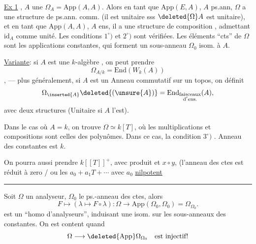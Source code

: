 \uline{Ex 1}  , $A$ une  
$\Omega_A=\mathrm{App}(A,A)$.
Alors en tant que $\mathrm{App}(E,A)$, $A$ ps.ann, $\Omega$ a une structure de ps.ann. comm.
(il est unitaire sss $\deleted{\Omega} A$ est unitaire),
et en tant que $\mathrm{App}(A,A)$, $A$ ens, il a une structure de composition  , admettant $\mathrm{id}_A$ comme unité.
Les conditions $1^\circ)$ et $2^\circ)$ sont vérifiées.
Les  éléments ``cts'' de $\Omega$ sont les applications constantes, qui forment un sous-anneau $\Omega_0$ isom. à $A$.

\uline{Variante}: si $A$ est une $k$-algèbre , on peut prendre
\[
\Omega_{A/k}=\mathrm{End}(W_k(A))
\]
,
--- plus généralement, si $A$ est un Anneau commutatif sur un topos, on définit
\[
\Omega_{\inserted{A}}\deleted{(\unsure{A})}
=\mathrm{End}_{\substack{\mathrm{faisceaux}\\\mathrm{d'ens.}}}(A),
\]
avec deux structures  
(Unitaire si $A$ l'est).

Dans le cas où $A=k$, on trouve $\Omega\simeq k[T]$, où les  multiplications et compositions sont celles des polynômes.
Dans ce cas, la condition $3^\circ)$ .
Anneau des constantes est $k$.

On pourra aussi prendre $k[[T]]^+$, avec produit et $x\circ y$,
(l'anneau des ctes est réduit à zero / ou les $a_0+a_1T+\cdots$ avec $a_0$ \uline{nilpotent}

\hrule
Soit $\Omega$ un analyseur, $\Omega_0$ le ps.-anneau des ctes, alors
\[
F\longmapsto(\lambda\longmapsto F\circ\lambda):
\Omega\longrightarrow\mathrm{App}(\Omega_0,\Omega_0)=\Omega_{\Omega_0}.
\]
est un ``homo d'analyseurs'', induisant une isom. sur les sous-anneaux des constantes.
On est content quand
\[
\Omega\longrightarrow\deleted{\mathrm{App}}\Omega_{\Omega_0}
\quad\text{est injectif!}
\]
